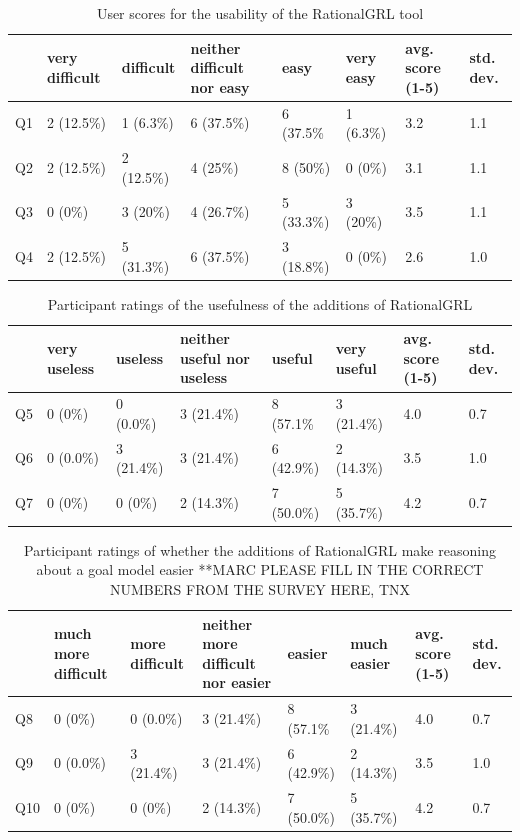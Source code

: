 \begin{table}[t]
\centering
\begin{tabularx}{0.95\textwidth}{l|l|l|l|l|l|l|l}
& very difficult & difficult & neither difficult nor easy & easy & very easy & avg. score (1-5) & std. dev.\\
\hline
Q1 & 2 (12.5\%) & 1 (6.3\%) & 6 (37.5\%) & 6 (37.5\% & 1 (6.3\%) & 3.2 & 1.1\\
Q2 & 2 (12.5\%) & 2 (12.5\%) & 4 (25\%) & 8 (50\%) & 0 (0\%) & 3.1 & 1.1\\
Q3 & 0 (0\%) & 3 (20\%) & 4 (26.7\%) & 5 (33.3\%) & 3 (20\%) & 3.5 & 1.1\\
Q4 & 2 (12.5\%) & 5 (31.3\%) & 6 (37.5\%) & 3 (18.8\%) & 0 (0\%) & 2.6 & 1.0
\end{tabularx}
\caption{User scores for the usability of the RationalGRL tool}
\label{table:survey:table1}
\end{table}

\begin{table}[t]
\centering
\begin{tabularx}{0.95\textwidth}{l|l|l|l|l|l|l|l}
& very useless & useless & neither useful nor useless & useful & very useful & avg. score (1-5) & std. dev.\\
\hline
Q5 & 0 (0\%) & 0 (0.0\%) & 3 (21.4\%) & 8 (57.1\% & 3 (21.4\%) & 4.0 & 0.7\\
Q6 & 0 (0.0\%) & 3 (21.4\%) & 3 (21.4\%) & 6 (42.9\%) & 2 (14.3\%) & 3.5 & 1.0\\
Q7 & 0 (0\%) & 0 (0\%) & 2 (14.3\%) & 7 (50.0\%) & 5 (35.7\%) & 4.2 & 0.7
\end{tabularx}
\caption{Participant ratings of the usefulness of the additions of RationalGRL}
\label{table:survey:table2}
\end{table}

\begin{table}[t]
\centering
\begin{tabularx}{0.95\textwidth}{l|l|l|l|l|l|l|l}
& much more difficult & more difficult & neither more difficult nor easier & easier & much easier & avg. score (1-5) & std. dev.\\
\hline
Q8 & 0 (0\%) & 0 (0.0\%) & 3 (21.4\%) & 8 (57.1\% & 3 (21.4\%) & 4.0 & 0.7\\
Q9 & 0 (0.0\%) & 3 (21.4\%) & 3 (21.4\%) & 6 (42.9\%) & 2 (14.3\%) & 3.5 & 1.0\\
Q10 & 0 (0\%) & 0 (0\%) & 2 (14.3\%) & 7 (50.0\%) & 5 (35.7\%) & 4.2 & 0.7
\end{tabularx}
\caption{Participant ratings of whether the additions of RationalGRL make reasoning about a goal model easier **MARC PLEASE FILL IN THE CORRECT NUMBERS FROM THE SURVEY HERE, TNX}
\label{table:survey:table3}
\end{table}

